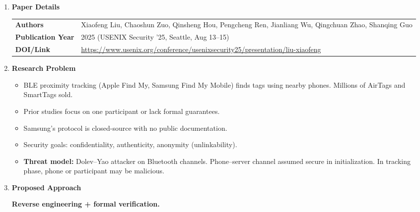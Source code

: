\documentclass[11pt,a4paper]{article}
\newcommand{\entrypart}[1]{\textbf{\color{accent}#1}\par\vspace{2pt}}
\begin{document}
\begin{enumerate}

    \item \entrypart{Paper Details}

    \begin{tabular}{@{}>{\bfseries}p{3.2cm} p{11.5cm}@{}}
        Authors          & Xiaofeng Liu, Chaoshun Zuo, Qinsheng Hou, Pengcheng Ren, Jianliang Wu, Qingchuan Zhao, Shanqing Guo \\[2pt]
        Publication Year & 2025 (USENIX Security '25, Seattle, Aug 13--15) \\[2pt]
        DOI/Link         & \url{https://www.usenix.org/conference/usenixsecurity25/presentation/liu-xiaofeng}
    \end{tabular}

    \item \entrypart{Research Problem}

    \begin{itemize}
        \item BLE proximity tracking (Apple Find My, Samsung Find My Mobile) finds tags using nearby phones. Millions of AirTags and SmartTags sold.
        \item Prior studies focus on one participant or lack formal guarantees.
        \item Samsung's protocol is closed-source with no public documentation.
        \item Security goals: confidentiality, authenticity, anonymity (unlinkability).
        \item \textbf{Threat model:} Dolev--Yao attacker on Bluetooth channels. Phone--server channel assumed secure in initialization. In tracking phase, phone or participant may be malicious.
    \end{itemize}

    \item \entrypart{Proposed Approach}

    \textbf{Reverse engineering + formal verification.}


\end{enumerate}
\end{document}

